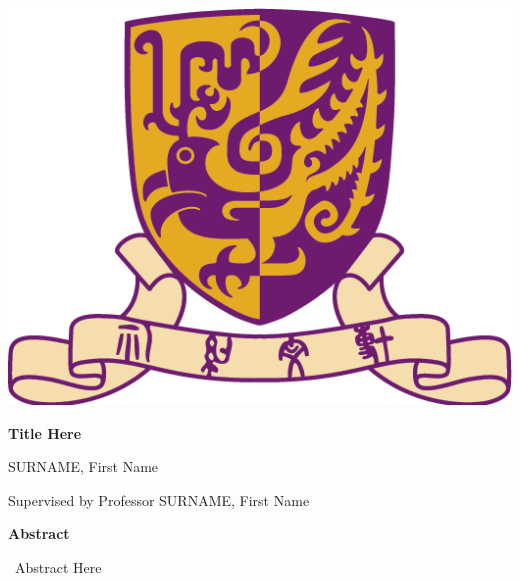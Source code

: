 \documentclass[12pt]{report}
\begin{document}
\begin{titlepage}
\begin{center}
    \includegraphics[scale=0.2]{full_color_cuhk.png}
\end{center}


\begin{center}
    \vspace*{1cm}
    
    {\large \textbf{Title Here}}
    \vspace{0.5cm}
    
    {\large SURNAME, First Name}
    \vspace{0.5cm}
    
    {\large Supervised by Professor SURNAME, First Name}
\end{center}
\vspace{1cm}


\begin{center}
    \textbf{Abstract}
\end{center}

~Abstract Here
\vspace{0.5cm}

\end{titlepage}
\end{document}
